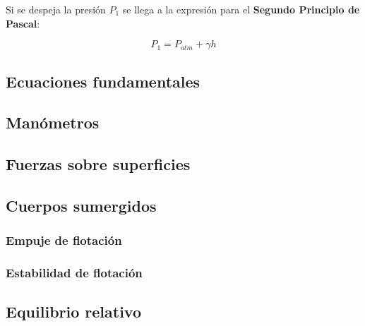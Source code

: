 Si se despeja la presión $P_1$ se llega a la expresión para el \textbf{Segundo Principio de Pascal}:

\begin{equation}
	P_1 = P_{atm} + \gamma h
\end{equation}
\subsection{Ecuaciones fundamentales}

\subsection{Manómetros} %

\subsection{Fuerzas sobre superficies}

\subsection{Cuerpos sumergidos}

\subsubsection{Empuje de flotación}

\subsubsection{Estabilidad de flotación}

\subsection{Equilibrio relativo}	
